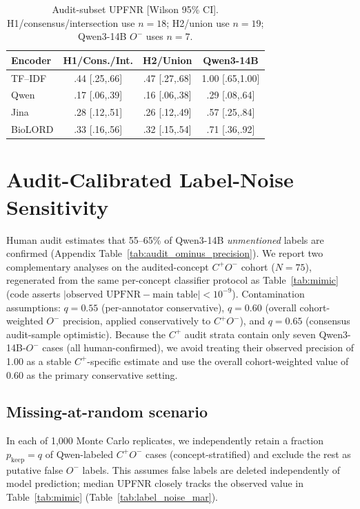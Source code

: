 \documentclass[11pt]{article}
\begin{document}
\begin{table}[!htbp]
  \centering
  \scriptsize
  \renewcommand{\arraystretch}{1.06}
  \caption{Audit-subset UPFNR [Wilson 95\% CI]. H1/consensus/intersection use
  $n=18$; H2/union use $n=19$; Qwen3-14B $O^-$ uses $n=7$.}
  \label{tab:audit_sensitivity}
  \begin{tabular*}{\columnwidth}{@{\extracolsep{\fill}}lccc@{}}
    \toprule
    \textbf{Encoder} & \textbf{H1/Cons./Int.} &
    \textbf{H2/Union} & \textbf{Qwen3-14B} \\
    \midrule
    TF--IDF & .44 [.25,.66] & .47 [.27,.68] & 1.00 [.65,1.00] \\
    Qwen    & .17 [.06,.39] & .16 [.06,.38] & .29 [.08,.64] \\
    Jina    & .28 [.12,.51] & .26 [.12,.49] & .57 [.25,.84] \\
    BioLORD & .33 [.16,.56] & .32 [.15,.54] & .71 [.36,.92] \\
    \bottomrule
  \end{tabular*}
\end{table}

\section{Audit-Calibrated Label-Noise Sensitivity}
\label{app:label_noise}

Human audit estimates that 55--65\% of Qwen3-14B \emph{unmentioned}
labels are confirmed (Appendix Table~\ref{tab:audit_ominus_precision}).
We report two complementary analyses on the audited-concept
$C^+O^-$ cohort ($N=75$), regenerated from the same per-concept classifier
protocol as Table~\ref{tab:mimic} (code asserts
$|\text{observed UPFNR} - \text{main table}| < 10^{-9}$).
Contamination assumptions: $q=0.55$ (per-annotator conservative),
$q=0.60$ (overall cohort-weighted $O^-$ precision, applied conservatively to
$C^+O^-$), and $q=0.65$ (consensus audit-sample optimistic).
Because the $C^+$ audit strata contain only seven Qwen3-14B-$O^-$ cases (all
human-confirmed), we avoid treating their observed precision of 1.00 as a
stable $C^+$-specific estimate and use the overall cohort-weighted value of
0.60 as the primary conservative setting.

\subsection{Missing-at-random scenario}
In each of 1{,}000 Monte Carlo replicates, we independently retain a fraction
$p_{\text{keep}}=q$ of Qwen-labeled $C^+O^-$ cases (concept-stratified) and
exclude the rest as putative false $O^-$ labels.
This assumes false labels are deleted independently of model prediction; median
UPFNR closely tracks the observed value in Table~\ref{tab:mimic}
(Table~\ref{tab:label_noise_mar}).
\end{document}
